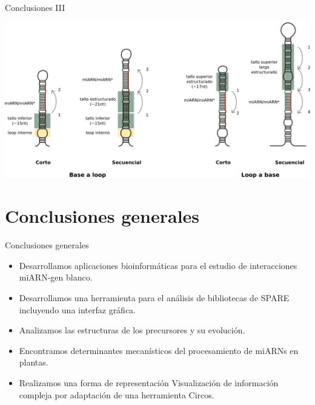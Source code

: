 \documentclass{beamer}
\begin{document}
\begin{frame}{Conclusiones III}
	\begin{center}
		\includegraphics[width=1\textwidth]{img/mecanismos_conclusionIII.png}
	\end{center}
\end{frame}


\section{Conclusiones generales}

\begin{frame}{Conclusiones generales}
	\begin{itemize}
        \item<1-> Desarrollamos aplicaciones bioinformáticas para el estudio de interacciones miARN-gen blanco.
        \item<2-> Desarrollamos una herramienta para el análisis de bibliotecas de SPARE incluyendo una interfaz gráfica.
        \item<3-> Analizamos las estructuras de los precursores y su evolución.
		\item<4-> Encontramos determinantes mecanísticos del procesamiento de miARNs en plantas.
        \item<5-> Realizamos una forma de representación Visualización de información compleja por adaptación de una herramienta Circos.
    \end{itemize}
\end{frame}

\end{document}
